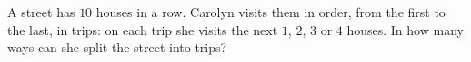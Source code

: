 A street has $10$ houses in a row. Carolyn visits them in order, from the first to the last, in trips: on each trip she visits the next $1$, $2$, $3$ or $4$ houses. In how many ways can she split the street into trips?
